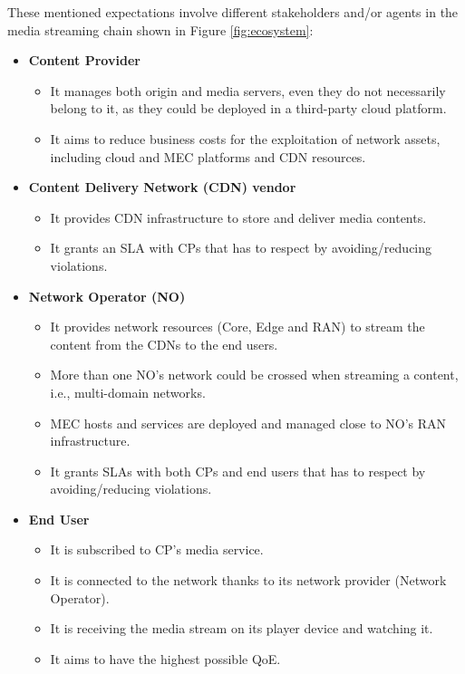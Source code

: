 These mentioned expectations involve different stakeholders and/or agents in the media streaming chain shown in Figure \ref{fig:ecosystem}:

\begin{itemize}

	\item \textbf{Content Provider}
	\begin{itemize}
		\item It manages both origin and media servers, even they do not necessarily belong to it, as they could be deployed in a third-party cloud platform.
		\item It aims to reduce business costs for the exploitation of network assets, including cloud and MEC platforms and CDN resources.
	\end{itemize}
	
	\item \textbf{Content Delivery Network (CDN) vendor}
	\begin{itemize}
		\item It provides CDN infrastructure to store and deliver media contents.
		\item It grants an SLA with CPs that has to respect by avoiding/reducing violations.
	\end{itemize}

	\item \textbf{Network Operator (NO)}
	\begin{itemize}
		\item It provides network resources (Core, Edge and RAN) to stream the content from the CDNs to the end users.
		\item More than one NO's network could be crossed when streaming a content, i.e., multi-domain networks.
		\item MEC hosts and services are deployed and managed close to NO's RAN infrastructure.
		\item It grants SLAs with both CPs and end users that has to respect by avoiding/reducing violations.
	\end{itemize}

	\item \textbf{End User}
	\begin{itemize}
		\item It is subscribed to CP's media service.
		\item It is connected to the network thanks to its network provider (Network Operator).
		\item It is receiving the media stream on its player device and watching it.
		\item It aims to have the highest possible QoE.
	\end{itemize}

\end{itemize}	

